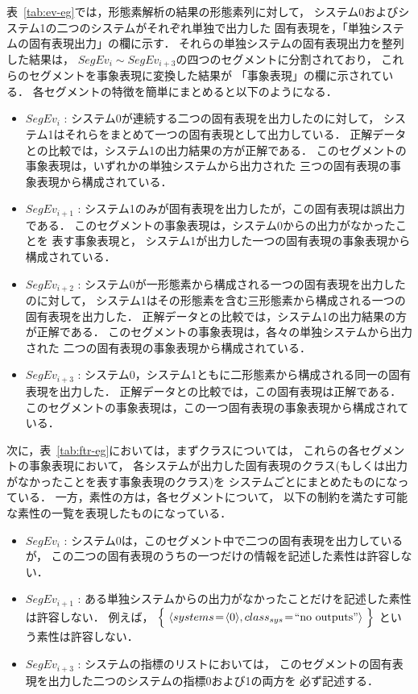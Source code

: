 表~\ref{tab:ev-eg}では，形態素解析の結果の形態素列に対して，
システム0およびシステム1の二つのシステムがそれぞれ単独で出力した
固有表現を，「単独システムの固有表現出力」の欄に示す．
それらの単独システムの固有表現出力を整列した結果は，
$SegEv_i\sim SegEv_{i+3}$の四つのセグメントに分割されており，
これらのセグメントを事象表現に変換した結果が
「事象表現」の欄に示されている．
各セグメントの特徴を簡単にまとめると以下のようになる．
\begin{itemize}
\item $SegEv_i$	:
	システム0が連続する二つの固有表現を出力したのに対して，
	システム1はそれらをまとめて一つの固有表現として出力している．
	正解データとの比較では，システム1の出力結果の方が正解である．
	このセグメントの事象表現は，いずれかの単独システムから出力された
	三つの固有表現の事象表現から構成されている．
\item $SegEv_{i+1}$ :
	システム1のみが固有表現を出力したが，この固有表現は誤出力である．
	このセグメントの事象表現は，システム0からの出力がなかったことを
	表す事象表現と，
	システム1が出力した一つの固有表現の事象表現から構成されている．
\item $SegEv_{i+2}$ :
	システム0が一形態素から構成される一つの固有表現を出力したのに対して，
	システム1はその形態素を含む三形態素から構成される一つの固有表現を出力した．
	正解データとの比較では，システム1の出力結果の方が正解である．
	このセグメントの事象表現は，各々の単独システムから出力された
	二つの固有表現の事象表現から構成されている．
\item $SegEv_{i+3}$ :
	システム0，システム1ともに二形態素から構成される同一の固有表現を出力した．
	正解データとの比較では，この固有表現は正解である．
	このセグメントの事象表現は，この一つ固有表現の事象表現から構成されている．
\end{itemize}

次に，表~\ref{tab:ftr-eg}においては，まずクラスについては，
これらの各セグメントの事象表現において，
各システムが出力した固有表現のクラス(もしくは出力がなかったことを表す事象表現のクラス)を
システムごとにまとめたものになっている．
一方，素性の方は，各セグメントについて，
以下の制約を満たす可能な素性の一覧を表現したものになっている．
\begin{itemize}
\item $SegEv_i$	:
	システム0は，このセグメント中で二つの固有表現を出力しているが，
	この二つの固有表現のうちの一つだけの情報を記述した素性は許容しない．
\item $SegEv_{i+1}$ :
	ある単独システムからの出力がなかったことだけを記述した素性は許容しない．
	例えば，	
	$\Bigl\{\
	 \langle 
	 systems\!=\!
	 \langle 0\rangle,
	class_{sys}\!=\!
	\mbox{``no outputs''}\rangle\ \Bigr\}$
	という素性は許容しない．
\item $SegEv_{i+3}$ :
	システムの指標のリストにおいては，
	このセグメントの固有表現を出力した二つのシステムの指標0および1の両方を
	必ず記述する．
\end{itemize}


